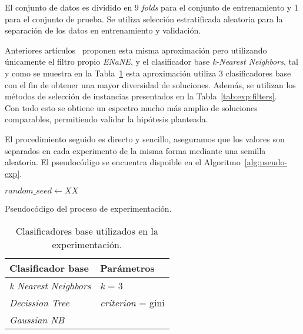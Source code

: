 El conjunto de datos es dividido en 9 \textit{folds} para el conjunto de entrenamiento y 1 para el conjunto de prueba. Se utiliza selección estratificada aleatoria para la separación de los datos en entrenamiento y validación.

Anteriores artículos~\cite{li2019selfk} proponen esta misma aproximación pero utilizando únicamente el filtro propio \emph{ENaNE}, y el clasificador base \textit{k-Nearest Neighbors}, tal y como se muestra en la Tabla~\ref{tab:exp:classifiers} esta aproximación utiliza 3 clasificadores base con el fin de obtener una mayor diversidad de soluciones. Además, se utilizan los métodos de selección de instancias presentados en la Tabla~\ref{tab:exp:filters}.\\
Con todo esto se obtiene un espectro mucho más amplio de soluciones comparables, permitiendo validar la hipótesis planteada.

El  procedimiento seguido es directo y sencillo, aseguramos que los valores son separados en cada experimento de la misma forma mediante una semilla aleatoria. El pseudocódigo se encuentra dispoible en el Algoritmo~\ref{alg:pseudo-exp}.

\begin{algorithm}[]
  $random\_seed \leftarrow XX$
	\caption{Pseudocódigo del proceso de experimentación.}\label{alg:pseudo-exp}
\end{algorithm}

\begin{table}[]
    \centering
    \begin{tabular}{ll}
	\toprule
        \textbf{Clasificador base} & \textbf{Parámetros} \\ 
    \toprule
        \textit{k Nearest Neighbors} & \textit{k} = 3 \\
        \textit{Decission Tree} & \textit{criterion} = gini \\ 
        \textit{Gaussian NB} & ~ \\ 
    \bottomrule
    \end{tabular}
    \caption{Clasificadores base utilizados en la experimentación.}\label{tab:exp:classifiers}
\end{table}

